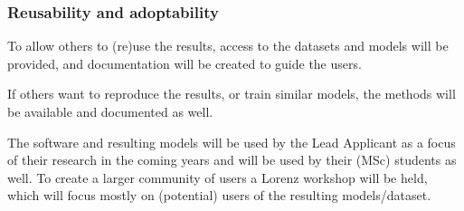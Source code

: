 \subsubsection{Reusability and adoptability}
To allow others to (re)use the results, access to the datasets and models will be provided, and documentation will be
created to guide the users.

If others want to reproduce the results, or train similar models, the methods will be available and documented as well.

The software and resulting models will be used by the Lead Applicant as a focus of their research in the coming years
and will be used by their (MSc) students as well. To create a larger community of users a Lorenz workshop will be held,
which will focus mostly on (potential) users of the resulting models/dataset.